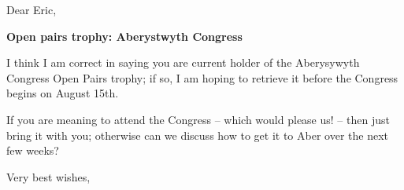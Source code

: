 \documentclass[12pt]{letter}
\begin{document}
\begin{letter}{}
\opening{Dear Eric,}

{\bf Open pairs trophy: Aberystwyth Congress}

I think I am correct in saying you are current holder of the
Aberysywyth Congress Open Pairs trophy; if so, I am hoping to
retrieve it before the Congress begins on August 15th.

If you are meaning to attend the Congress -- which would please us! --
then just bring it with you; otherwise can we discuss how to get it
to Aber over the next few weeks?

\closing{Very best wishes,}

\end{letter}
\end{document}
